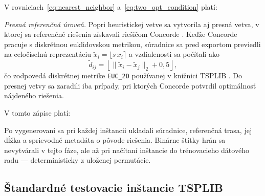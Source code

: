 \indent V rovniciach~\eqref{eq:nearest_neighbor}
a~\eqref{eq:two_opt_condition} platí:
\begin{symboltable}
\end{symboltable}

\indent \textit{Presná referenčná úroveň.}
Popri heuristickej vetve sa vytvorila aj presná vetva, v ktorej sa
referenčné riešenia získavali riešičom Concorde
\parencite{concorde2003solver}. Keďže Concorde pracuje s diskrétnou
euklidovskou metrikou, súradnice sa pred exportom previedli na
celočíselnú reprezentáciu \(\tilde{x}_i = \lfloor s\, x_i \rceil\)
a vzdialenosti sa počítali ako
\begin{equation}
\tilde{d}_{ij}
= \left\lfloor \lVert \tilde{x}_i - \tilde{x}_j \rVert_2 + 0{,}5
  \right\rfloor,
\label{eq:tsplib_distance}
\end{equation}
čo zodpovedá diskrétnej metrike \texttt{EUC\_2D} používanej
v knižnici TSPLIB \parencite{reinelt1991tsplib}. Do presnej
vetvy sa zaradili iba prípady, pri ktorých Concorde potvrdil
optimálnosť nájdeného riešenia.

\indent V tomto zápise platí:
\begin{symboltable}
\end{symboltable}

\indent Po vygenerovaní sa pri každej inštancii ukladali súradnice,
referenčná trasa, jej dĺžka a sprievodné metadáta o pôvode riešenia.
Binárne štítky hrán sa nevytvárali v tejto fáze, ale až pri načítaní
inštancie do trénovacieho dátového radu — deterministicky z uloženej
permutácie.

\subsection{Štandardné testovacie inštancie TSPLIB}
\label{sec:tsplib}

